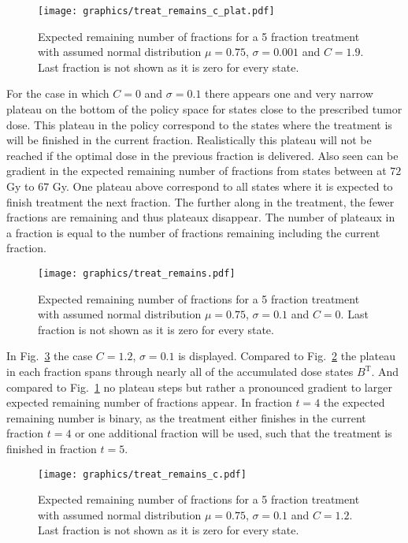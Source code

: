 \documentclass[\relativeRoot/ada.tex]{subfiles}
\begin{document}
\begin{figure}[!htb]
    \centering
    \texttt{[image: graphics/treat\_remains\_c\_plat.pdf]}
    \caption{Expected remaining number of fractions for a 5 fraction treatment with assumed normal distribution $\mu=0.75$, $\sigma=0.001$ and $C=1.9$. Last fraction is not shown as it is zero for every state.}
    \label{fig:treat_remains_c_plat}
\end{figure}

For the case in which $C=0$ and $\sigma=0.1$ there appears one and very narrow plateau on the bottom of the policy space for states close to the prescribed tumor dose. This plateau in the policy correspond to the states where the treatment is will be finished in the current fraction. Realistically this plateau will not be reached if the optimal dose in the previous fraction is delivered. Also seen can be gradient in the expected remaining number of fractions from states between at $72$ Gy to $67$ Gy. One plateau above correspond to all states where it is expected to finish treatment the next fraction. The further along in the treatment, the fewer fractions are remaining and thus plateaux disappear. The number of plateaux in a fraction is equal to the number of fractions remaining including the current fraction.

\begin{figure}[!htb]
    \centering
    \texttt{[image: graphics/treat\_remains.pdf]}
    \caption{Expected remaining number of fractions for a 5 fraction treatment with assumed normal distribution $\mu=0.75$, $\sigma=0.1$ and $C=0$. Last fraction is not shown as it is zero for every state.}
    \label{fig:treat_remains}
\end{figure}

In Fig.~\ref{fig:treat_remains_c} the case $C=1.2$, $\sigma=0.1$ is displayed. Compared to Fig.~\ref{fig:treat_remains} the plateau in each fraction spans through nearly all of the accumulated dose states $B^{\text{T}}$. And compared to Fig.~\ref{fig:treat_remains_c_plat} no plateau steps but rather a pronounced gradient to larger expected remaining number of fractions appear. In fraction $t=4$ the expected remaining number is binary, as the treatment either finishes in the current fraction $t=4$ or one additional fraction will be used, such that the treatment is finished in fraction $t=5$.

\begin{figure}[!htb]
    \centering
    \texttt{[image: graphics/treat\_remains\_c.pdf]}
    \caption{Expected remaining number of fractions for a 5 fraction treatment with assumed normal distribution $\mu=0.75$, $\sigma=0.1$ and $C=1.2$. Last fraction is not shown as it is zero for every state.}
    \label{fig:treat_remains_c}
\end{figure}
\end{document}
